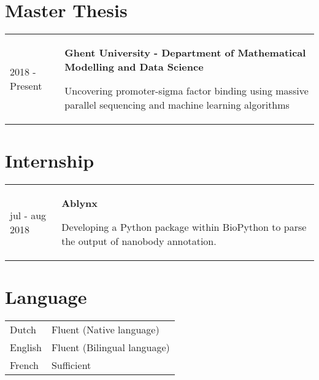 \documentclass{article}
\begin{document}
\section{Master Thesis}
\begin{tabular}{ p{2.3cm} p{12cm}}
    2018 - Present & \textbf{Ghent University - Department of Mathematical Modelling and Data Science}

    Uncovering promoter-sigma factor binding using massive parallel sequencing and machine learning algorithms \\
\end{tabular}

\section{Internship}
\begin{tabular}{ p{2.3cm} p{12cm} }
    jul - aug 2018 & \textbf{Ablynx}
    
    Developing a Python package within BioPython to parse the output of nanobody annotation.
\end{tabular}

\section{Language}
\begin{tabular}{ p{2.3cm} p{12cm} }
    Dutch & Fluent (Native language) \\
    English & Fluent (Bilingual language) \\
    French & Sufficient\\
\end{tabular}
\end{document}

